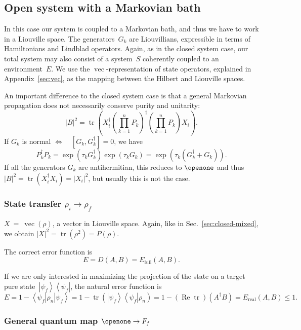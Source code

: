 \documentclass[aps, pra, a4paper, longbibliography, superscriptaddress]{revtex4-1}
\newcommand{\I}{\openone}
\newcommand{\be}{\begin{equation}}
\newcommand{\ee}{\end{equation}}
\newcommand{\eq}{\Leftrightarrow}
\newcommand{\ket}[1]{\left| #1 \right \rangle}
\newcommand{\bra}[1]{\left \langle #1 \right|}
\newcommand{\ketbra}[2]{\left| #1 \right \rangle \left \langle #2 \right|}
\DeclareMathOperator{\tr}{tr}
\DeclareMathOperator{\re}{Re}
\DeclareMathOperator{\cvec}{vec}
\begin{document}
\subsection{Open system with a Markovian bath}

In this case our system is coupled to a Markovian bath, and thus
we have to work in a Liouville space.
The generators~$G_k$ are Liouvillians, expressible in terms of
Hamiltonians and Lindblad operators.
Again, as in the closed system case, our total system may also consist of 
a system~$S$ coherently coupled to an environment~$E$.
We use the $\cvec$-representation of state
operators, explained in Appendix~\ref{sec:vec},
as the mapping between the Hilbert and Liouville spaces.

An important difference to the closed system case is that a general Markovian propagation
does not necessarily conserve purity and unitarity:
\be
|B|^2 = \tr\left(X_i^\dagger \left(\prod_{k=1}^{n} P_k\right)^\dagger \left(\prod_{k=1}^{n} P_k\right) X_i\right).
\ee
If $G_k$ is normal $\eq \quad [G_k, G^\dagger_k] = 0$, we have
\be
P_k^\dagger P_k
= \exp(\tau_k G^\dagger_k) \exp(\tau_k G_k)
= \exp(\tau_k (G_k^\dagger + G_k)).
\ee
If all the generators $G_k$ are antihermitian, this reduces to $\I$ and thus
$|B|^2 = \tr(X_i^\dagger X_i) = |X_i|^2$, but usually this is not
the case.



\subsubsection{State transfer $\rho_i \to \rho_f$}

$X~=~\cvec(\rho)$, a vector in Liouville space. Again, like in
Sec.~\ref{sec:closed-mixed}, we obtain
$|X|^2 = \tr(\rho^2) = P(\rho)$.

The correct error function is
\be
E
= D(A, B)
= E_\text{full}(A, B).
\ee

If we are only interested in maximizing the projection of
the state on a target pure state~$\ketbra{\psi_f}{\psi_f}$, the natural error
function is
\be
E
= 1 -\bra{\psi_f} \rho_n \ket{\psi_f}
= 1 -\tr\left(\ketbra{\psi_f}{\psi_f} \rho_n \right)
= 1 -(\re \tr)\left(A^\dagger B\right)
= E_\text{real}(A, B) \le 1.
\ee



\subsubsection{General quantum map $\I \to F_f$}
\end{document}

